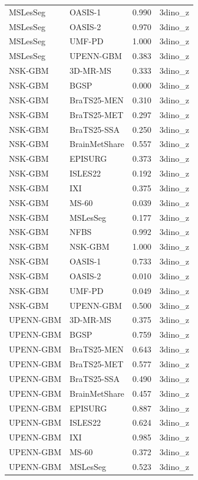 \begin{tabular}{llrl}
MSLesSeg & OASIS-1 & 0.990 & 3dino\_z \\
MSLesSeg & OASIS-2 & 0.970 & 3dino\_z \\
MSLesSeg & UMF-PD & 1.000 & 3dino\_z \\
MSLesSeg & UPENN-GBM & 0.383 & 3dino\_z \\
NSK-GBM & 3D-MR-MS & 0.333 & 3dino\_z \\
NSK-GBM & BGSP & 0.000 & 3dino\_z \\
NSK-GBM & BraTS25-MEN & 0.310 & 3dino\_z \\
NSK-GBM & BraTS25-MET & 0.297 & 3dino\_z \\
NSK-GBM & BraTS25-SSA & 0.250 & 3dino\_z \\
NSK-GBM & BrainMetShare & 0.557 & 3dino\_z \\
NSK-GBM & EPISURG & 0.373 & 3dino\_z \\
NSK-GBM & ISLES22 & 0.192 & 3dino\_z \\
NSK-GBM & IXI & 0.375 & 3dino\_z \\
NSK-GBM & MS-60 & 0.039 & 3dino\_z \\
NSK-GBM & MSLesSeg & 0.177 & 3dino\_z \\
NSK-GBM & NFBS & 0.992 & 3dino\_z \\
NSK-GBM & NSK-GBM & 1.000 & 3dino\_z \\
NSK-GBM & OASIS-1 & 0.733 & 3dino\_z \\
NSK-GBM & OASIS-2 & 0.010 & 3dino\_z \\
NSK-GBM & UMF-PD & 0.049 & 3dino\_z \\
NSK-GBM & UPENN-GBM & 0.500 & 3dino\_z \\
UPENN-GBM & 3D-MR-MS & 0.375 & 3dino\_z \\
UPENN-GBM & BGSP & 0.759 & 3dino\_z \\
UPENN-GBM & BraTS25-MEN & 0.643 & 3dino\_z \\
UPENN-GBM & BraTS25-MET & 0.577 & 3dino\_z \\
UPENN-GBM & BraTS25-SSA & 0.490 & 3dino\_z \\
UPENN-GBM & BrainMetShare & 0.457 & 3dino\_z \\
UPENN-GBM & EPISURG & 0.887 & 3dino\_z \\
UPENN-GBM & ISLES22 & 0.624 & 3dino\_z \\
UPENN-GBM & IXI & 0.985 & 3dino\_z \\
UPENN-GBM & MS-60 & 0.372 & 3dino\_z \\
UPENN-GBM & MSLesSeg & 0.523 & 3dino\_z \\

\end{tabular}
